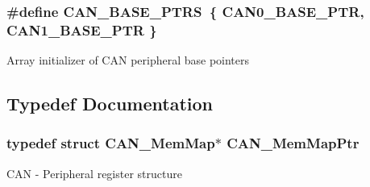 \subsubsection[{C\+A\+N\+\_\+\+B\+A\+S\+E\+\_\+\+P\+T\+R\+S}]{\setlength{\rightskip}{0pt plus 5cm}\#define C\+A\+N\+\_\+\+B\+A\+S\+E\+\_\+\+P\+T\+R\+S~\{ {\bf C\+A\+N0\+\_\+\+B\+A\+S\+E\+\_\+\+P\+T\+R}, {\bf C\+A\+N1\+\_\+\+B\+A\+S\+E\+\_\+\+P\+T\+R} \}}\label{group___c_a_n___peripheral_gaf9ce8b815aacb2022a8a7454f4028a6c}
Array initializer of C\+A\+N peripheral base pointers 

\subsection{Typedef Documentation}
\hypertarget{group___c_a_n___peripheral_gadc219505f1f3c5212d1e670b3d57d9b6}{}
\subsubsection[{C\+A\+N\+\_\+\+Mem\+Map\+Ptr}]{\setlength{\rightskip}{0pt plus 5cm}typedef struct {\bf C\+A\+N\+\_\+\+Mem\+Map}$\ast$ {\bf C\+A\+N\+\_\+\+Mem\+Map\+Ptr}}\label{group___c_a_n___peripheral_gadc219505f1f3c5212d1e670b3d57d9b6}
C\+A\+N -\/ Peripheral register structure 